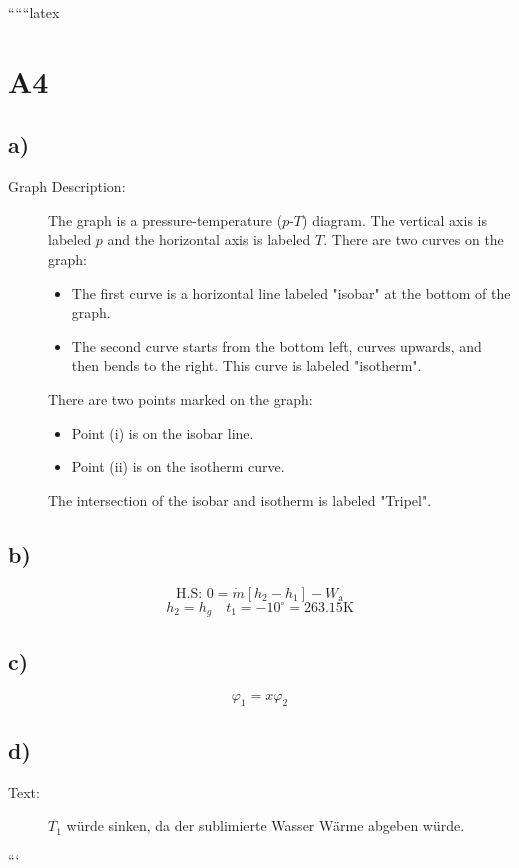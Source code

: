 
``````latex


\section*{A4}

\subsection*{a)}
\begin{description}
    \item[Graph Description:] The graph is a pressure-temperature ($p$-$T$) diagram. The vertical axis is labeled $p$ and the horizontal axis is labeled $T$. There are two curves on the graph:
    \begin{itemize}
        \item The first curve is a horizontal line labeled "isobar" at the bottom of the graph.
        \item The second curve starts from the bottom left, curves upwards, and then bends to the right. This curve is labeled "isotherm".
    \end{itemize}
    There are two points marked on the graph:
    \begin{itemize}
        \item Point (i) is on the isobar line.
        \item Point (ii) is on the isotherm curve.
    \end{itemize}
    The intersection of the isobar and isotherm is labeled "Tripel".
\end{description}

\subsection*{b)}
\[
\text{H.S: } 0 = \dot{m} [h_2 - h_1] - W_{\text{a}}
\]
\[
h_2 = h_g \quad t_1 = -10^\circ = 263.15 \text{K}
\]

\subsection*{c)}
\[
\varphi_1 = x \varphi_2
\]

\subsection*{d)}
\begin{description}
    \item[Text:] $T_1$ würde sinken, da der sublimierte Wasser Wärme abgeben würde.
\end{description}

```